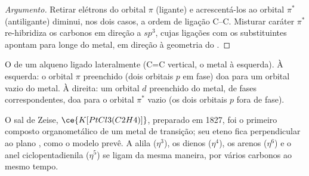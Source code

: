 \begin{proof}[Argumento]
Retirar elétrons do orbital $\pi$ (ligante) e acrescentá-los ao orbital $\pi^*$
(antiligante) diminui, nos dois casos, a ordem de ligação C--C. Misturar caráter $\pi^*$
re-hibridiza os carbonos em direção a $sp^3$, cujas ligações com os substituintes apontam para longe
do metal, em direção à geometria do .
\end{proof}

\begin{omfigure}

{\small O  de um alqueno ligado lateralmente (C=C
vertical, o metal à esquerda). À esquerda: o orbital $\pi$ preenchido (dois orbitais $p$ em
fase) doa para um orbital vazio do metal. À direita: um orbital $d$ preenchido do metal,
de fases correspondentes, doa para o orbital $\pi^*$ vazio (os dois orbitais $p$ fora de
fase).}
\end{omfigure}

O sal de Zeise, $\ce{K[PtCl3(C2H4)]}$, preparado em 1827, foi o primeiro composto organometálico
de um metal de transição; seu eteno fica perpendicular ao plano , como
o modelo prevê. A alila ($\eta^3$), os dienos ($\eta^4$), os arenos ($\eta^6$) e o anel
ciclopentadienila ($\eta^5$) se ligam da mesma maneira, por vários carbonos ao mesmo tempo.

